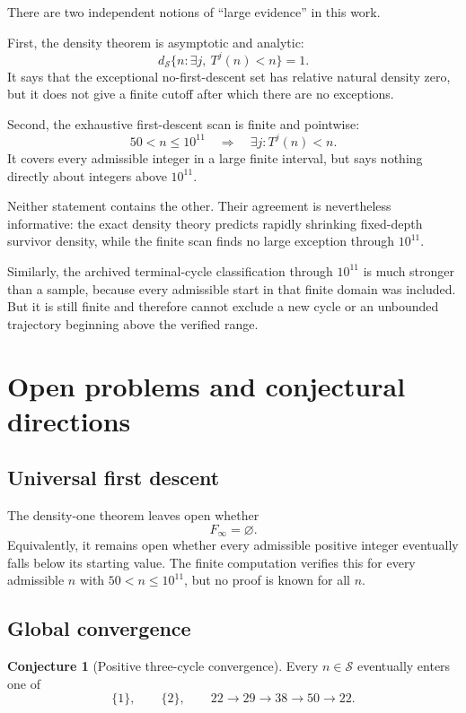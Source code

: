 \documentclass[11pt]{article}
\theoremstyle{definition}
\newtheorem{conjecture}[theorem]{Conjecture}
\theoremstyle{remark}
\newcommand{\Sset}{\mathcal S}
\newcommand{\ds}{d_{\Sset}}
\begin{document}
There are two independent notions of ``large evidence'' in this work.

First, the density theorem is asymptotic and analytic:
\[
\ds\{n:\exists j,\ T^j(n)<n\}=1.
\]
It says that the exceptional no-first-descent set has relative natural density zero, but it does not give a finite cutoff after which there are no exceptions.

Second, the exhaustive first-descent scan is finite and pointwise:
\[
50<n\le10^{11}
\quad\Longrightarrow\quad
\exists j:T^j(n)<n.
\]
It covers every admissible integer in a large finite interval, but says nothing directly about integers above $10^{11}$.

Neither statement contains the other.  Their agreement is nevertheless informative: the exact density theory predicts rapidly shrinking fixed-depth survivor density, while the finite scan finds no large exception through $10^{11}$.

Similarly, the archived terminal-cycle classification through $10^{11}$ is much stronger than a sample, because every admissible start in that finite domain was included.  But it is still finite and therefore cannot exclude a new cycle or an unbounded trajectory beginning above the verified range.

\section{Open problems and conjectural directions}

\subsection{Universal first descent}

The density-one theorem leaves open whether
\[
F_\infty=\varnothing.
\]
Equivalently, it remains open whether every admissible positive integer eventually falls below its starting value.  The finite computation verifies this for every admissible $n$ with $50<n\le10^{11}$, but no proof is known for all $n$.

\subsection{Global convergence}

\begin{conjecture}[Positive three-cycle convergence]
Every $n\in\Sset$ eventually enters one of
\[
\{1\},\qquad
\{2\},\qquad
22\to29\to38\to50\to22.
\]
\end{conjecture}
\end{document}
